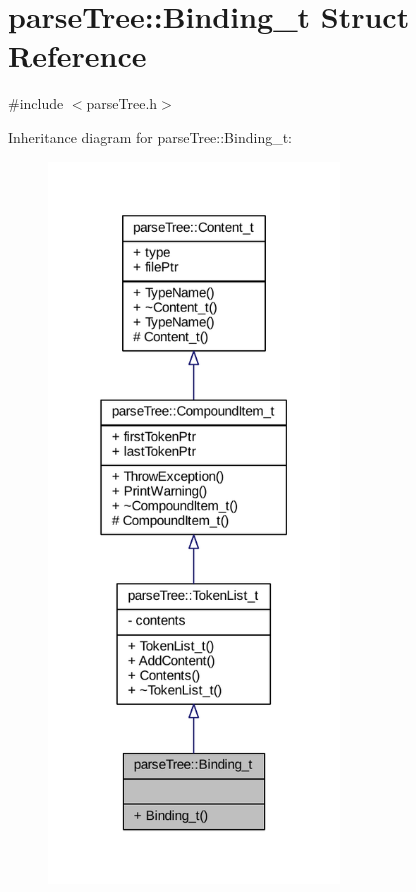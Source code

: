 \hypertarget{structparse_tree_1_1_binding__t}{}\section{parse\+Tree\+:\+:Binding\+\_\+t Struct Reference}
\label{structparse_tree_1_1_binding__t}


{\ttfamily \#include $<$parse\+Tree.\+h$>$}



Inheritance diagram for parse\+Tree\+:\+:Binding\+\_\+t\+:
\nopagebreak
\begin{figure}[H]
\begin{center}
\leavevmode
\includegraphics[width=219pt]{structparse_tree_1_1_binding__t__inherit__graph}
\end{center}
\end{figure}


